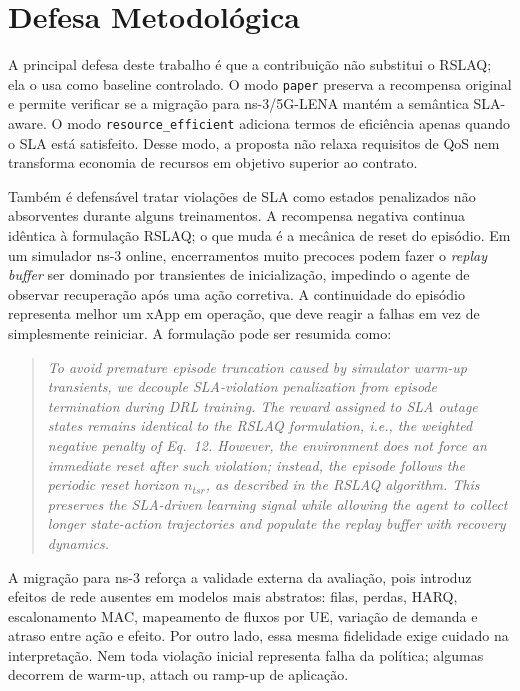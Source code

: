 \documentclass[10pt,a4paper]{IEEEtran}
\begin{document}
\section{Defesa Metodol\'{o}gica}
\label{sec:defesa}

A principal defesa deste trabalho \'{e} que a contribui\c{c}\~{a}o
n\~{a}o substitui o RSLAQ; ela o usa como baseline controlado. O
modo \texttt{paper} preserva a recompensa original e permite
verificar se a migra\c{c}\~{a}o para ns-3/5G-LENA mant\'{e}m a
sem\^{a}ntica SLA-aware. O modo \texttt{resource\_efficient}
adiciona termos de efici\^{e}ncia apenas quando o SLA est\'{a}
satisfeito. Desse modo, a proposta n\~{a}o relaxa requisitos de
QoS nem transforma economia de recursos em objetivo superior ao
contrato.

Tamb\'{e}m \'{e} defens\'{a}vel tratar viola\c{c}\~{o}es de
SLA como estados penalizados n\~{a}o absorventes durante
alguns treinamentos. A recompensa negativa continua
id\^{e}ntica \`{a} formula\c{c}\~{a}o RSLAQ; o que muda \'{e} a
mec\^{a}nica de reset do epis\'{o}dio. Em um simulador ns-3
online, encerramentos muito precoces podem fazer o \emph{replay
buffer} ser dominado por transientes de inicializa\c{c}\~{a}o,
impedindo o agente de observar recupera\c{c}\~{a}o ap\'{o}s uma
a\c{c}\~{a}o corretiva. A continuidade do epis\'{o}dio
representa melhor um xApp em opera\c{c}\~{a}o, que deve reagir
a falhas em vez de simplesmente reiniciar. A formula\c{c}\~{a}o
pode ser resumida como:

\begin{quote}
\emph{To avoid premature episode truncation caused by
simulator warm-up transients, we decouple SLA-violation
penalization from episode termination during DRL training. The
reward assigned to SLA outage states remains identical to the
RSLAQ formulation, i.e., the weighted negative penalty of
Eq.~12. However, the environment does not force an immediate
reset after such violation; instead, the episode follows the
periodic reset horizon $n_{\textit{tsr}}$, as described in the
RSLAQ algorithm. This preserves the SLA-driven learning signal
while allowing the agent to collect longer state-action
trajectories and populate the replay buffer with recovery
dynamics.}
\end{quote}

A migra\c{c}\~{a}o para ns-3 refor\c{c}a a validade externa
da avalia\c{c}\~{a}o, pois introduz efeitos de rede ausentes
em modelos mais abstratos: filas, perdas, HARQ, escalonamento
MAC, mapeamento de fluxos por UE, varia\c{c}\~{a}o de demanda
e atraso entre a\c{c}\~{a}o e efeito. Por outro lado, essa
mesma fidelidade exige cuidado na interpreta\c{c}\~{a}o.
Nem toda viola\c{c}\~{a}o inicial representa falha da
pol\'{i}tica; algumas decorrem de warm-up, attach ou
ramp-up de aplica\c{c}\~{a}o.
\end{document}
